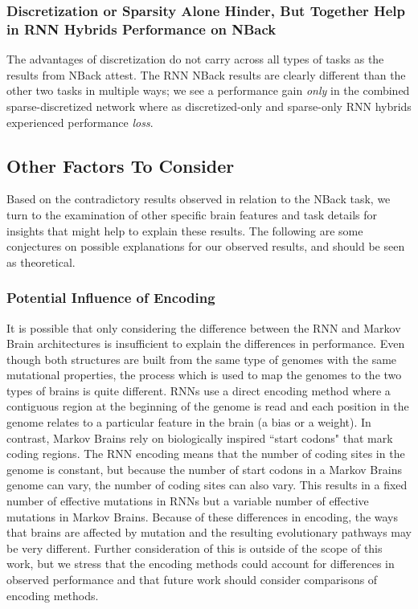 \subsubsection{Discretization or Sparsity Alone Hinder, But Together Help in RNN Hybrids Performance on NBack} The advantages of discretization do not carry across all types of tasks as the results from NBack attest. 
The RNN NBack results are clearly different than the other two tasks in multiple ways; we see a performance gain \textit{only} in the combined sparse-discretized network where as discretized-only and sparse-only RNN hybrids experienced performance \textit{loss}.

\subsection{Other Factors To Consider}
Based on the contradictory results observed in relation to the NBack task, we turn to the examination of other specific brain features and task details for insights that might help to explain these results. 
The following are some conjectures on possible explanations for our observed results, and should be seen as theoretical.

\subsubsection{Potential Influence of Encoding} It is possible that only considering the difference between the RNN and Markov Brain architectures is insufficient to explain the differences in performance.  
Even though both structures are built from the same type of genomes with the same mutational properties, the process which is used to map the genomes to the two types of brains is quite different. 
RNNs use a direct encoding method where a contiguous region at the beginning of the genome is read and each position in the genome relates to a particular feature in the brain (a bias or a weight). 
In contrast, Markov Brains rely on biologically inspired ``start codons" that mark coding regions. 
The RNN encoding means that the number of coding sites in the genome is constant, but because the number of start codons in a Markov Brains genome can vary, the number of coding sites can also vary. 
This results in a fixed number of effective mutations in RNNs but a variable number of effective mutations in Markov Brains. 
Because of these differences in encoding, the ways that brains are affected by mutation and the resulting evolutionary pathways may be very different. 
Further consideration of this is outside of the scope of this work, but we stress that the encoding methods could account for differences in observed performance and that future work should consider comparisons of encoding methods.

